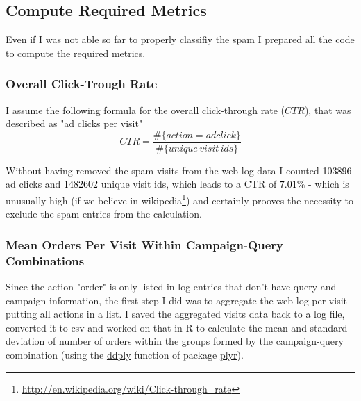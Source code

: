 \documentclass{article}\usepackage[]{graphicx}\usepackage[]{color}
\begin{document}

\subsection{Compute Required Metrics} %
\label{sub:compute_metrics}

Even if I was not able so far to properly classifiy the spam I prepared all the code to compute the required metrics.

\subsubsection{Overall Click-Trough Rate} %
\label{subsub:ctr}

I assume the following formula for the overall click-through rate ($CTR$), that was described as "ad clicks per visit"
$$
CTR = \frac{ \#\{action=adclick\} }{ \#\{unique \, visit \, ids\}}
$$

Without having removed the spam visits from the web log data I counted \textcolor{black}{103896} ad clicks and \textcolor{black}{1482602} unique visit ids, which leads to a CTR of \textcolor{black}{$7.01\%$} - which is unusually high (if we believe in wikipedia\footnote{\url{http://en.wikipedia.org/wiki/Click-through_rate}}) and certainly prooves the necessity to exclude the spam entries from the calculation.




\subsubsection{Mean Orders Per Visit Within Campaign-Query Combinations} %
\label{subsub:mean_cq}
Since the action "order" is only listed in log entries that don't have query and campaign information, the first step I did was to aggregate the web log per visit 
putting all actions in a list.
I saved the aggregated visits data back to a log file, converted it to csv and worked on that in R to calculate the mean and standard deviation of number of orders within the groups formed by the campaign-query combination (using the \href{http://www.inside-r.org/packages/cran/plyr/docs/ddply}{ddply} function of package \href{http://cran.r-project.org/web/packages/plyr/index.html}{plyr}).
\end{document}
